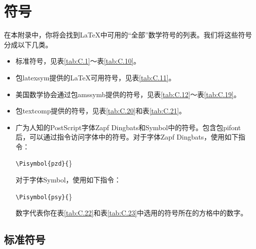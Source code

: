 \chapter{符号}

在本附录中，你将会找到\LaTeX 中可用的``全部''数学符号的列表。我们将这些符号分成以下几类。

\begin{itemize}
    \item 标准符号，见表\ref{tab:C.1}～表\ref{tab:C.10}。
    \item 包\textsf{latexsym}提供的\LaTeX 可用符号，见表\ref{tab:C.11}。
    \item 美国数学协会通过包\textsf{amssymb}提供的符号，见表\ref{tab:C.12}～表\ref{tab:C.19}。
    \item 包\textsf{textcomp}提供的符号，见表\ref{tab:C.20}和表\ref{tab:C.21}。
    \item 广为人知的PostScript字体Zapf Dingbats和Symbol中的符号。包含包\textsf{pifont}后，可以通过指令访问字体中的符号。对于字体Zapf Dingbats，使用如下指令：
    
    \begin{dmd}
\verb+\Pisymbol{pzd}{+\}
    \end{dmd}

    对于字体Symbol，使用如下指令：

    \begin{dmd}
\verb+\Pisymbol{psy}{+\}
    \end{dmd}
    
    数字代表你在表\ref{tab:C.22}和表\ref{tab:C.23}中选用的符号所在的方格中的数字。
\end{itemize}

\newcommand{\ms}[1]{\dm{\backslash #1} & $\csname#1\endcsname$}
\newcommand{\msdel}[1]{\dm{\backslash #1} & $\left\csname#1\endcsname\right.$}

\section{标准符号}

